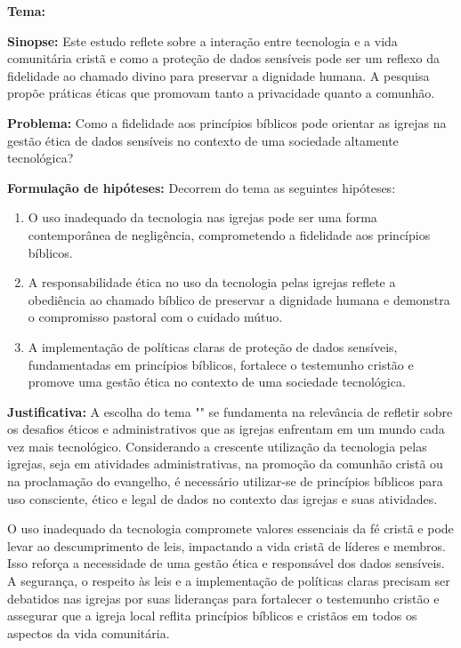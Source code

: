 \documentclass[12pt,a4paper]{article}
\begin{document}
\hypersetup{pageanchor=false}  %







\newpage
\pagestyle{plain}
\renewcommand{\baselinestretch}{1.5}
\normalsize
\noindent
\textbf{Tema:} \tema

\noindent
\textbf{Sinopse:} Este estudo reflete sobre a interação entre tecnologia e a vida comunitária cristã e como a proteção de dados sensíveis pode ser um reflexo da fidelidade ao chamado divino para preservar a dignidade humana. A pesquisa propõe práticas éticas que promovam tanto a privacidade quanto a comunhão.

\noindent
\textbf{Problema:} Como a fidelidade aos princípios bíblicos pode orientar as igrejas na gestão ética de dados sensíveis no contexto de uma sociedade altamente tecnológica?

\noindent
\textbf{Formulação de hipóteses:}
Decorrem do tema as seguintes hipóteses:
\begin{enumerate}
    \item O uso inadequado da tecnologia nas igrejas pode ser uma forma contemporânea de negligência, comprometendo a fidelidade aos princípios bíblicos.
    \item A responsabilidade ética no uso da tecnologia pelas igrejas reflete a obediência ao chamado bíblico de preservar a dignidade humana e demonstra o compromisso pastoral com o cuidado mútuo.
    \item A implementação de políticas claras de proteção de dados sensíveis, fundamentadas em princípios bíblicos, fortalece o testemunho cristão e promove uma gestão ética no contexto de uma sociedade tecnológica.
\end{enumerate}

\noindent
\textbf{Justificativa:} A escolha do tema "\tema" se fundamenta na relevância de refletir sobre os desafios éticos e administrativos que as igrejas enfrentam em um mundo cada vez mais tecnológico. Considerando a crescente utilização da tecnologia pelas igrejas, seja em atividades administrativas, na promoção da comunhão cristã ou na proclamação do evangelho, é necessário utilizar-se de princípios bíblicos para uso consciente, ético e legal de dados no contexto das igrejas e suas atividades.

O uso inadequado da tecnologia compromete valores essenciais da fé cristã e pode levar ao descumprimento de leis, impactando a vida cristã de líderes e membros. Isso reforça a necessidade de uma gestão ética e responsável dos dados sensíveis. A segurança, o respeito às leis e a implementação de políticas claras precisam ser debatidos nas igrejas por suas lideranças para fortalecer o testemunho cristão e assegurar que a igreja local reflita princípios bíblicos e cristãos em todos os aspectos da vida comunitária.
\end{document}
